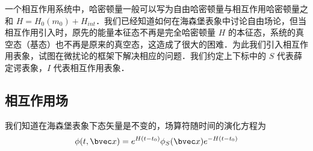 
一个相互作用系统中，哈密顿量一般可以写为自由哈密顿量与相互作用哈密顿量之和 $H=H_0(m_0)+H_{int}$．我们已经知道如何在海森堡表象中讨论自由场论，但当相互作用引入时，原先的能量本征态不再是完全哈密顿量 $H$ 的本征态，系统的真空态（基态）也不再是原来的真空态，这造成了很大的困难．为此我们引入相互作用表象，试图在微扰论的框架下解决相应的问题．我们约定上下标中的 $S$ 代表薛定谔表象，$I$ 代表相互作用表象．
\subsection{相互作用场}
我们知道在海森堡表象下态矢量是不变的，场算符随时间的演化方程为
\[
\phi(t,\bvec x)=e^{H(t-t_0)}\phi_S(\bvec x)e^{-H(t-t_0)}
\]

